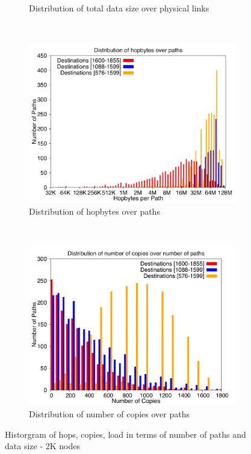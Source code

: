 \begin{figure}[!htbp]
\begin{subfigure}[b]{0.49\textwidth}
                \caption{Distribution of total data size over physical links}
                \label{fig:incrsize_2k_loaddata}
        \end{subfigure}
        ~ %
        \begin{subfigure}[b]{0.49\textwidth}
                \includegraphics[width=\textwidth]{report_figures/incrsize/2k/hopbyte_histo.pdf}
                \caption{Distribution of hopbytes over paths}
                \label{fig:incrsize_2k_hopbyte}
        \end{subfigure}
        ~ %
        \begin{subfigure}[b]{0.49\textwidth}
                \includegraphics[width=\textwidth]{report_figures/incrsize/2k/hopcopy_histo.pdf}
                \caption{Distribution of number of copies over paths}
                \label{fig:incrsize_2k_hopcopy}
        \end{subfigure}
        \caption{Historgram of hops, copies, load in terms of number of paths and data size - 2K nodes}
        \label{fig:incrsize_2k_histo}
\end{figure}
